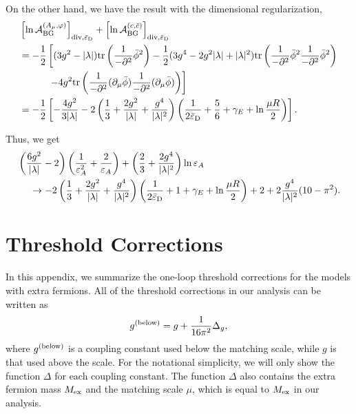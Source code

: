 \documentclass[12pt]{article}
\begin{document}
On the other hand, we have the result with the dimensional
regularization,
\begin{align}
  & \left[
  \ln\mathcal A^{(A_\mu,\varphi)}_{\rm BG}
 \right]_{{\rm div},\bar{\varepsilon}_{\rm D}}+
 \left[
  \ln\mathcal A_{\rm BG}^{(c,\bar{c})}
 \right]_{{\rm div},\bar{\varepsilon}_{\rm D}}\nonumber \\
  & = -\frac{1}{2}
 \left[
  (3g^2-|\lambda|){\rm tr}
  \left(
   \frac{1}{-\partial^2}\bar\phi^2
  \right)-\frac{1}{2}(3g^4-2g^2|\lambda|+|\lambda|^2){\rm tr}
  \left(
   \frac{1}{-\partial^2}\bar\phi^2\frac{1}{-\partial^2}\bar\phi^2
  \right)\right.\nonumber           \\
  & \hspace{7ex}\left.-4g^2{\rm tr}
  \left(
   \frac{1}{-\partial^2}(\partial_\mu\bar\phi)\frac{1}{-\partial^2}(\partial_\mu\bar\phi)
  \right)
 \right]\nonumber                   \\
  & = -\frac{1}{2}
 \left[
  -\frac{4g^2}{3|\lambda|}-2
  \left(
   \frac{1}{3}+\frac{2g^2}{|\lambda|}+\frac{g^4}{|\lambda|^2}
  \right)
  \left(
   \frac{1}{2\bar{\varepsilon}_{\rm D}}+\frac{5}{6}+\gamma_E+\ln\frac{\mu R}{2}
  \right)
 \right].
\end{align}

Thus, we get
\begin{align}
  &
 \left(
  \frac{6g^2}{|\lambda|}-2
 \right)
 \left(
  \frac{1}{\varepsilon_{A}^2}+\frac{2}{\varepsilon_{A}}
 \right)+
 \left(
  \frac{2}{3}+\frac{2g^4}{|\lambda|^2}
 \right)\ln\varepsilon_{A}\nonumber \\
  & \hspace{3ex} \to -2
 \left(
  \frac{1}{3}+\frac{2g^2}{|\lambda|}+\frac{g^4}{|\lambda|^2}
 \right)
 \left(
  \frac{1}{2\bar{\varepsilon}_{\rm D}}+1+\gamma_E+\ln\frac{\mu R}{2}
 \right)+2+2\frac{g^4}{|\lambda|^2}(10-\pi^2).
\end{align}

\section{Threshold Corrections}
\label{apx_threshold}
\setcounter{equation}{0}

In this appendix, we summarize the one-loop threshold corrections for
the models with extra fermions.  All of the threshold corrections in our
analysis can be written as
\begin{align}
 g^{\rm (below)} = g + \frac{1}{16\pi^2} \Delta_g,
\end{align}
where $g^{\rm (below)}$ is a coupling constant used below the matching
scale, while $g$ is that used above the scale.  For the notational
simplicity, we will only show the function $\Delta$ for each coupling
constant.  The function $\Delta$ also contains the extra fermion mass
$M_{\rm ex}$ and the matching scale $\mu$, which is equal to $M_{\rm ex}$
in our analysis.
\end{document}
